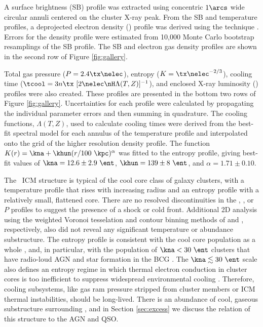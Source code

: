 \documentclass[useAMS,usenatbib]{mn2e}
\begin{document}
A surface brightness (SB) profile was extracted using concentric
$1\arcs$ wide circular annuli centered on the cluster X-ray peak. From
the SB and temperature profiles, a deprojected electron density
(\nelec) profile was derived using the \citet{kriss83} technique
\citep[see][for more detail]{accept}. Errors for the density profile
were estimated from 10,000 Monte Carlo bootstrap resamplings of the SB
profile. The SB and electron gas density profiles are shown in the
second row of Figure \ref{fig:gallery}.

Total gas pressure ($P = 2.4 \tx \nelec$), entropy ($K =
\tx\nelec^{-2/3}$), cooling time ($\tcool = 3n\tx~[2\nelec \nH
  \Lambda(T,Z)]^{-1}$), and enclosed X-ray luminosity (\lx) profiles
were also created. These profiles are presented in the bottom two rows
of Figure \ref{fig:gallery}. Uncertainties for each profile were
calculated by propagating the individual parameter errors and then
summing in quadrature. The cooling functions, $\Lambda(T,Z)$, used to
calculate cooling times were derived from the best-fit spectral model
for each annulus of the temperature profile and interpolated onto the
grid of the higher resolution density profile. The function $K(r) =
\kna +\khun (r/100 ~\kpc)^{\alpha}$ was fitted to the entropy profile,
giving best-fit values of $\kna = 12.6 \pm 2.9 ~\ent$, $\khun = 139
\pm 8 ~\ent$, and $\alpha = 1.71 \pm 0.10$.

The \rxj\ ICM structure is typical of the cool core class of galaxy
clusters, with a temperature profile that rises with increasing radius
and an entropy profile with a relatively small, flattened core. There
are no resolved discontinuities in the \tx, \nelec, or $P$ profiles to
suggest the presence of a shock or cold front. Additional 2D analysis
using the weighted Voronoi tesselation and contour binning methods of
\citet{wvt} and \citet{2006MNRAS.371..829S}, respectively, also did
not reveal any significant temperature or abundance substructure. The
entropy profile is consistent with the cool core population as a whole
\citep{accept}, and, in particular, with the population of $\kna < 30
~\ent$ clusters that have radio-loud AGN and star formation in the BCG
\citep{haradent, rafferty08}. The $\kna \la 30 ~\ent$ scale also
defines an entropy regime in which thermal electron conduction in
cluster cores is too inefficient to suppress widespread environmental
cooling \citep{conduction}. Therefore, cooling subsystems, like gas
ram pressure stripped from cluster members or ICM thermal
instabilities, should be long-lived. There is an abundance of cool,
gaseous substructure surrounding \irs, and in Section \ref{sec:excess}
we discuss the relation of this structure to the AGN and QSO.
\end{document}
